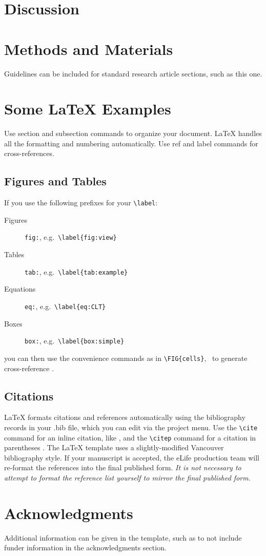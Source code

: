 \documentclass[9pt,lineno]{elife}
\begin{document}
\section{Discussion}

\lipsum[9]

\section{Methods and Materials}

Guidelines can be included for standard research article sections, such as this one. 

\lipsum[3]

\section{Some \LaTeX{} Examples}
\label{sec:examples}

Use section and subsection commands to organize your document. 
\LaTeX{} handles all the formatting and numbering automatically. 
Use ref and label commands for cross-references.

\subsection{Figures and Tables}


If you use the following prefixes for your \verb|\label|:
%
\begin{description}
\item[Figures] \texttt{fig:}, e.g.~\verb|\label{fig:view}|
\item[Tables] \texttt{tab:}, e.g.~\verb|\label{tab:example}|
\item[Equations] \texttt{eq:}, e.g.~\verb|\label{eq:CLT}|
\item[Boxes] \texttt{box:}, e.g.~\verb|\label{box:simple}|
\end{description}
%
you can then use the convenience commands as in \verb|\FIG{cells}|, \ to generate cross-reference . 

\subsection{Citations}

LaTeX formats citations and references automatically using the bibliography records in your .bib file, which you can edit via the project menu. 
Use the \verb|\cite| command for an inline citation, like \cite{trapnell2014pseudo}, and the \verb|\citep| command for a citation in parentheses \citep{trapnell2014pseudo}. 
The LaTeX template uses a slightly-modified Vancouver bibliography style. 
If your manuscript is accepted, the eLife production team will re-format the references into the final published form. 
\emph{It is not necessary to attempt to format the reference list yourself to mirror the final published form.}


\section{Acknowledgments}

Additional information can be given in the template, such as to not include funder information in the acknowledgments section.

\nocite{*} %

\end{document}
